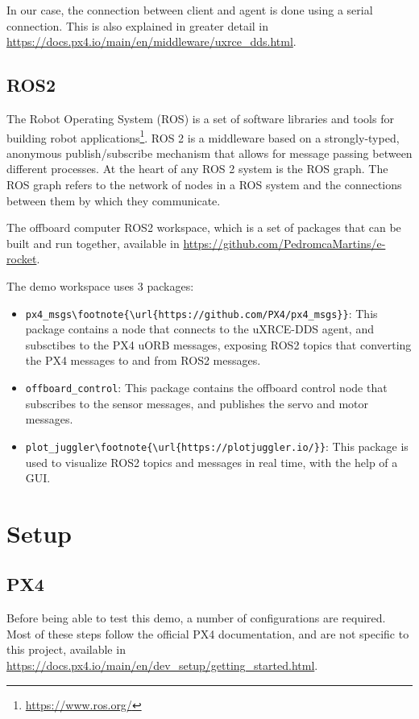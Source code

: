 \documentclass[a4paper]{article}
\begin{document}
In our case, the connection between client and agent is done using a serial connection. 
This is also explained in greater detail in \url{https://docs.px4.io/main/en/middleware/uxrce_dds.html}. 

\subsection{ROS2}

The Robot Operating System (ROS) is a set of software libraries and tools for building robot applications\footnote{\url{https://www.ros.org/}}. 
ROS 2 is a middleware based on a strongly-typed, anonymous publish/subscribe mechanism that allows for message passing between different processes. 
At the heart of any ROS 2 system is the ROS graph. The ROS graph refers to the network of nodes in a ROS system and the connections between them by which they communicate. 

The offboard computer  ROS2 workspace, which is a set of packages that can be built and run together, available in \url{https://github.com/PedromcaMartins/e-rocket}. 

The demo workspace uses 3 packages: 
\begin{itemize}
    \item \verb|px4_msgs\footnote{\url{https://github.com/PX4/px4_msgs}}|: This package contains a node that connects to the uXRCE-DDS agent, and subsctibes to the PX4 uORB messages, exposing ROS2 topics that converting the PX4 messages to and from ROS2 messages.
    \item \verb|offboard_control|: This package contains the offboard control node that subscribes to the sensor messages, and publishes the servo and motor messages.
    \item \verb|plot_juggler\footnote{\url{https://plotjuggler.io/}}|: This package is used to visualize ROS2 topics and messages in real time, with the help of a GUI.
\end{itemize}



\clearpage
\section{Setup}

\subsection{PX4}

Before being able to test this demo, a number of configurations are required. 
Most of these steps follow the official PX4 documentation, and are not specific to this project, available in \url{https://docs.px4.io/main/en/dev_setup/getting_started.html}. 
\end{document}
